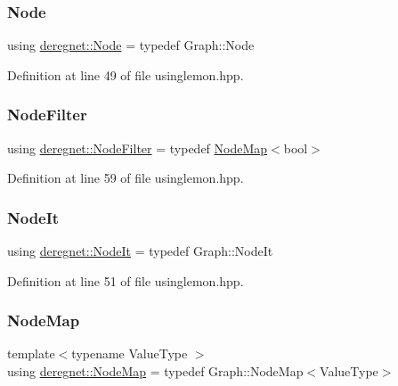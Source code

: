 \subsubsection{\texorpdfstring{Node}{Node}}
{\footnotesize\ttfamily using \hyperlink{namespacederegnet_a744bad34f2de9856d36715a445f027f3}{deregnet\+::\+Node} = typedef Graph\+::\+Node}



Definition at line 49 of file usinglemon.\+hpp.

\mbox{\label{namespacederegnet_a50db1f8fc7c6a954d825d9e1ed9ad302}} 
\subsubsection{\texorpdfstring{Node\+Filter}{NodeFilter}}
{\footnotesize\ttfamily using \hyperlink{namespacederegnet_a50db1f8fc7c6a954d825d9e1ed9ad302}{deregnet\+::\+Node\+Filter} = typedef \hyperlink{namespacederegnet_ae102b707ae1d6f83c639ece5e0dd5658}{Node\+Map}$<$bool$>$}



Definition at line 59 of file usinglemon.\+hpp.

\mbox{\label{namespacederegnet_ac34314e1b5f456fc6d1bb9d96316de4a}} 
\subsubsection{\texorpdfstring{Node\+It}{NodeIt}}
{\footnotesize\ttfamily using \hyperlink{namespacederegnet_ac34314e1b5f456fc6d1bb9d96316de4a}{deregnet\+::\+Node\+It} = typedef Graph\+::\+Node\+It}



Definition at line 51 of file usinglemon.\+hpp.

\mbox{\label{namespacederegnet_ae102b707ae1d6f83c639ece5e0dd5658}} 
\subsubsection{\texorpdfstring{Node\+Map}{NodeMap}}
{\footnotesize\ttfamily template$<$typename Value\+Type $>$ \\
using \hyperlink{namespacederegnet_ae102b707ae1d6f83c639ece5e0dd5658}{deregnet\+::\+Node\+Map} = typedef Graph\+::\+Node\+Map$<$Value\+Type$>$}



